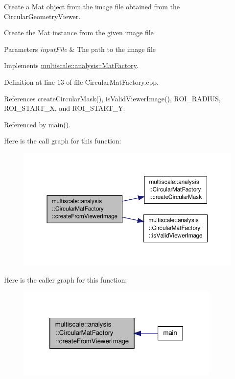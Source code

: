 Create a Mat object from the image file obtained from the Circular\-Geometry\-Viewer. 

Create the Mat instance from the given image file


\begin{DoxyParams}{Parameters}
{\em input\-File} & The path to the image file \\
\hline
\end{DoxyParams}


Implements \hyperlink{classmultiscale_1_1analysis_1_1MatFactory_a719ca9ac925ee182c1d5df1b0b029394}{multiscale\-::analysis\-::\-Mat\-Factory}.



Definition at line 13 of file Circular\-Mat\-Factory.\-cpp.



References create\-Circular\-Mask(), is\-Valid\-Viewer\-Image(), R\-O\-I\-\_\-\-R\-A\-D\-I\-U\-S, R\-O\-I\-\_\-\-S\-T\-A\-R\-T\-\_\-\-X, and R\-O\-I\-\_\-\-S\-T\-A\-R\-T\-\_\-\-Y.



Referenced by main().



Here is the call graph for this function\-:\nopagebreak
\begin{figure}[H]
\begin{center}
\leavevmode
\includegraphics[width=350pt]{classmultiscale_1_1analysis_1_1CircularMatFactory_a8d5fccf946065b982bfa700b9e47b1f5_cgraph}
\end{center}
\end{figure}




Here is the caller graph for this function\-:\nopagebreak
\begin{figure}[H]
\begin{center}
\leavevmode
\includegraphics[width=284pt]{classmultiscale_1_1analysis_1_1CircularMatFactory_a8d5fccf946065b982bfa700b9e47b1f5_icgraph}
\end{center}
\end{figure}


